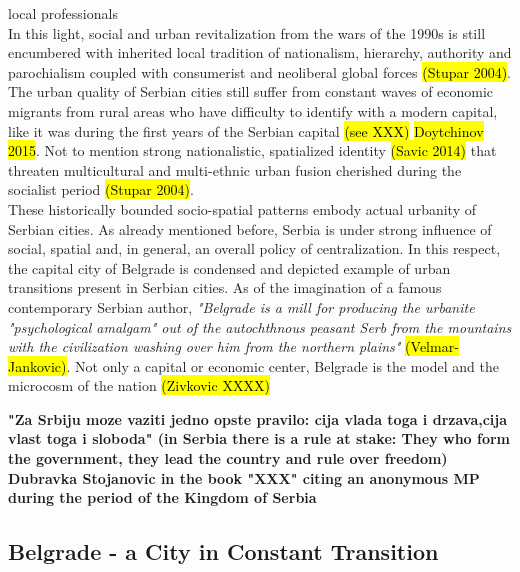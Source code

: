 \documentclass[11pt]{report}
\begin{document}
local professionals  
\\
In this light, social and urban revitalization from the wars of the 1990s is still encumbered with inherited local tradition of nationalism, hierarchy, authority and parochialism coupled with consumerist and neoliberal global forces \hl{(Stupar 2004)}. The urban quality of Serbian cities still suffer from constant waves of economic migrants from rural areas who have difficulty to identify with a modern capital, like it was during the first years of the Serbian capital \hl{(see XXX)} \hl{Doytchinov 2015}. Not to mention strong nationalistic, spatialized identity \hl{(Savic 2014)} that threaten multicultural and multi-ethnic urban fusion cherished during the socialist period \hl{(Stupar 2004)}.
\\
These historically bounded socio-spatial patterns embody actual urbanity of Serbian cities. As already mentioned before, Serbia is under strong influence of social, spatial and, in general, an overall policy of centralization. In this respect, the capital city of Belgrade is condensed and depicted example of urban transitions present in Serbian cities.
As of the imagination of a famous contemporary Serbian author, \textit{"Belgrade is a mill for producing the urbanite "psychological amalgam" out of the autochthnous peasant Serb from the mountains with the civilization washing over him from the northern plains"} \hl{(Velmar-Jankovic)}. Not only a capital or economic center, Belgrade is the model and the microcosm of the nation \hl{(Zivkovic XXXX)}

\textbf{"Za Srbiju moze vaziti jedno opste pravilo: cija vlada toga i drzava,cija vlast toga i sloboda" (in Serbia there is a rule at stake: They who form the government, they lead the country and rule over freedom) Dubravka Stojanovic in the book "XXX" citing an anonymous MP during the period of the Kingdom of Serbia}

\subsection{Belgrade - a City in Constant Transition}
\end{document}
